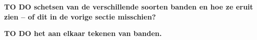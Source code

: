 \textbf{TO DO schetsen van de verschillende soorten banden en hoe ze eruit zien -- of dit in de vorige sectie misschien?}

\textbf{TO DO het aan elkaar tekenen van banden.}